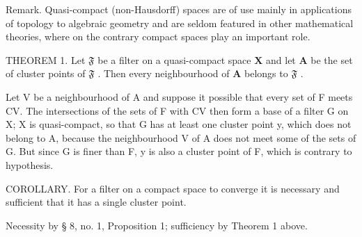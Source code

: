 Remark. Quasi-compact (non-Hausdorff) spaces are of use mainly in applications of topology to algebraic geometry and are seldom featured in other mathematical theories, where on the contrary compact spaces play an important role.

THEOREM 1. Let \(\mathfrak{F}\) be a filter on a quasi-compact space \(\mathbf{X}\) and let \(\mathbf{A}\) be the set of cluster points of \(\mathfrak{F}\) . Then every neighbourhood of \(\mathbf{A}\) belongs to \(\mathfrak{F}\) .

Let V be a neighbourhood of A and suppose it possible that every set of F meets CV. The intersections of the sets of F with CV then form a base of a filter G on X; X is quasi-compact, so that G has at least one cluster point y, which does not belong to A, because the neighbourhood V of A does not meet some of the sets of G. But since G is finer than F, y is also a cluster point of F, which is contrary to hypothesis.

COROLLARY. For a filter on a compact space to converge it is necessary and sufficient that it has a single cluster point.

Necessity by § 8, no. 1, Proposition 1; sufficiency by Theorem 1 above.

